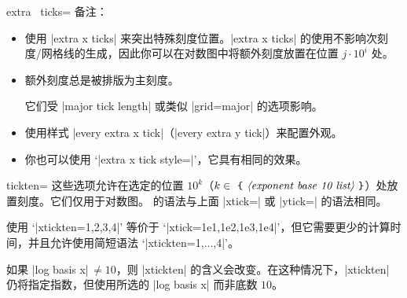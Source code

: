 \begin{pgfplotsxykey}{extra \x\ ticks=}
    备注：
    \begin{itemize}
        \item 使用 |extra x ticks| 来突出特殊刻度位置。|extra x ticks| 的使用不影响次刻度/网格线的生成，因此你可以在对数图中将额外刻度放置在位置 $j\cdot 10^i$ 处。
        \item 额外刻度总是被排版为主刻度。

            它们受 |major tick length| 或类似 |grid=major| 的选项影响。
        \item 使用样式 |every extra x tick|（|every extra y tick|）来配置外观。
        \item 你也可以使用 `|extra x tick style=|'，它具有相同的效果。
    \end{itemize}
\end{pgfplotsxykey}

\begin{pgfplotsxykey}{\x tickten=}
    这些选项允许在选定的位置 $10^k$（$k \in \text{\marg{exponent base 10 list}}$）处放置刻度。它们仅用于对数图。 的语法与上面 |xtick=| 或 |ytick=| 的语法相同。

    使用 `|xtickten={1,2,3,4}|' 等价于 `|xtick={1e1,1e2,1e3,1e4}|'，但它需要更少的计算时间，并且允许使用简短语法 `|xtickten={1,...,4}|'。
\begin{codeexample}[]
\end{codeexample}

    如果 |log basis x|$\,\neq 10$，则 |xtickten| 的含义会改变。在这种情况下，|xtickten| 仍将指定指数，但使用所选的 |log basis x| 而非底数 $10$。
\end{pgfplotsxykey}

